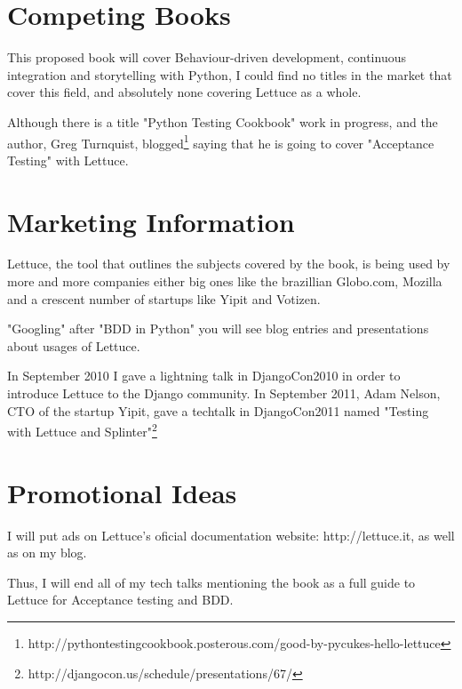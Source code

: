 \documentclass[letterpaper]{article}
\begin{document}
\section*{Competing Books }
\noindent
This proposed book will cover Behaviour-driven development, continuous
integration and storytelling with Python, I could find no titles in
the market that cover this field, and absolutely none covering
Lettuce as a whole.

\noindent
Although there is a title "Python Testing Cookbook" work in progress,
and the author, Greg Turnquist, blogged\footnote{http://pythontestingcookbook.posterous.com/good-by-pycukes-hello-lettuce} saying that he is going to cover
"Acceptance Testing" with Lettuce.

\section*{Marketing Information}

Lettuce, the tool that outlines the subjects covered by the book, is
being used by more and more companies either big ones like the
brazillian Globo.com, Mozilla and a crescent number of startups like
Yipit and Votizen.

\noindent
"Googling" after "BDD in Python" you will see blog entries and
presentations about usages of Lettuce.

\noindent
In September 2010 I gave a lightning talk in DjangoCon2010 in order to introduce Lettuce to the Django community.
In September 2011, Adam Nelson, CTO of the startup Yipit, gave a techtalk in DjangoCon2011 named "Testing with Lettuce and Splinter"\footnote{http://djangocon.us/schedule/presentations/67/}
\section*{Promotional Ideas}

I will put ads on Lettuce's oficial documentation website:
http://lettuce.it, as well as on my blog.

\noindent
Thus, I will end all of my tech talks mentioning the book as a full
guide to Lettuce for Acceptance testing and BDD.
\end{document}
